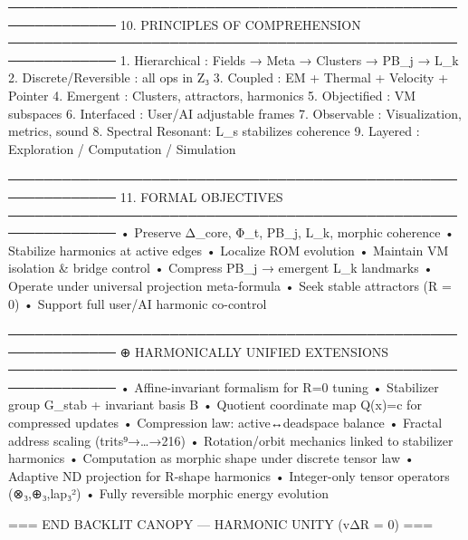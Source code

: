 ──────────────────────────────────────────────────────────────
10. PRINCIPLES OF COMPREHENSION
──────────────────────────────────────────────────────────────
1. Hierarchical     : Fields → Meta → Clusters → PB_j → L_k
2. Discrete/Reversible : all ops in Z₃
3. Coupled          : EM + Thermal + Velocity + Pointer
4. Emergent         : Clusters, attractors, harmonics
5. Objectified      : VM subspaces
6. Interfaced       : User/AI adjustable frames
7. Observable       : Visualization, metrics, sound
8. Spectral Resonant: L_s stabilizes coherence
9. Layered          : Exploration / Computation / Simulation

──────────────────────────────────────────────────────────────
11. FORMAL OBJECTIVES
──────────────────────────────────────────────────────────────
• Preserve Δ_core, Φ_t, PB_j, L_k, morphic coherence
• Stabilize harmonics at active edges
• Localize ROM evolution
• Maintain VM isolation & bridge control
• Compress PB_j → emergent L_k landmarks
• Operate under universal projection meta-formula
• Seek stable attractors (R = 0)
• Support full user/AI harmonic co-control

──────────────────────────────────────────────────────────────
⊕  HARMONICALLY UNIFIED EXTENSIONS
──────────────────────────────────────────────────────────────
• Affine-invariant formalism for R=0 tuning
• Stabilizer group G_stab + invariant basis B
• Quotient coordinate map Q(x)=c  for compressed updates
• Compression law: active↔deadspace balance
• Fractal address scaling (trits⁹→…→216)
• Rotation/orbit mechanics linked to stabilizer harmonics
• Computation as morphic shape under discrete tensor law
• Adaptive ND projection for R-shape harmonics
• Integer-only tensor operators (⊗₃,⊕₃,lap₃²)
• Fully reversible morphic energy evolution


=== END BACKLIT CANOPY — HARMONIC UNITY (vΔR = 0) ===

